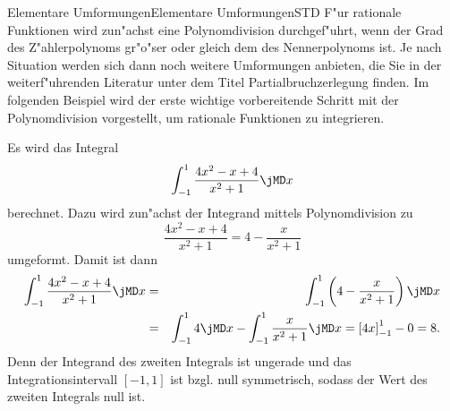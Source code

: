 \begin{MXContent}{Elementare Umformungen}{Elementare Umformungen}{STD}
F"ur rationale Funktionen wird zun"achst eine Polynomdivision durchgef"uhrt, 
wenn der Grad des Z"ahlerpolynoms gr"o"ser oder gleich dem des Nennerpolynoms 
ist. Je nach Situation werden sich dann noch weitere Umformungen anbieten,
die Sie in der weiterf"uhrenden Literatur unter dem Titel Partialbruchzerlegung
finden. Im folgenden Beispiel wird der erste wichtige vorbereitende Schritt 
mit der Polynomdivision vorgestellt, um rationale Funktionen zu integrieren.
\begin{MExample}
Es wird das Integral 
\[
\int_{-1}^{1} \frac{4 x^2 - x + 4}{x^2 + 1} \jMD x %
\]
berechnet. Dazu wird zun"achst der Integrand mittels Polynomdivision zu
\[
\frac{4 x^2 - x + 4}{x^2 + 1} = 4 - \frac{x}{x^2 + 1} %
\]
umgeformt. Damit ist dann
\begin{eqnarray*}
\int_{-1}^{1} \frac{4 x^2 - x + 4}{x^2 + 1} \jMD x %
& = & 
\int_{-1}^{1} \left(4 - \frac{x}{x^2 + 1}\right) \jMD x \\
& = & 
\int_{-1}^{1} 4 \jMD x - \int_{-1}^{1} \frac{x}{x^2 + 1} \jMD x %
= \left[4 x\right]_{-1}^{1} - 0 %
= 8.
\end{eqnarray*}
Denn der Integrand des zweiten Integrals ist ungerade und das 
Integrationsintervall $[-1, 1]$ ist bzgl. null symmetrisch, sodass der Wert
des zweiten Integrals null ist.
\end{MExample}

\end{MXContent}


